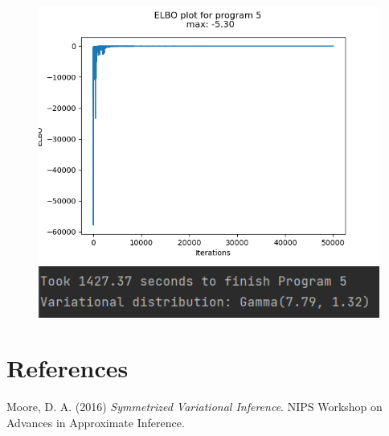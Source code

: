 \documentclass[10pt]{homeworg}
\begin{document}
\begin{figure}[!htbp]
    \centering
    \begin{minipage}{0.5\textwidth}
        \centering
       \includegraphics[scale=0.5]{figures/elbo_program_5.png}
    \end{minipage}\hfill
    \begin{minipage}{0.5\textwidth}
        \centering
        \includegraphics[scale=0.8]{figures/program5_time.png}
    \end{minipage}
\end{figure}

\section{References}
Moore, D. A. (2016) \textit{Symmetrized Variational Inference}. NIPS Workshop on Advances in Approximate Inference.
\end{document}
